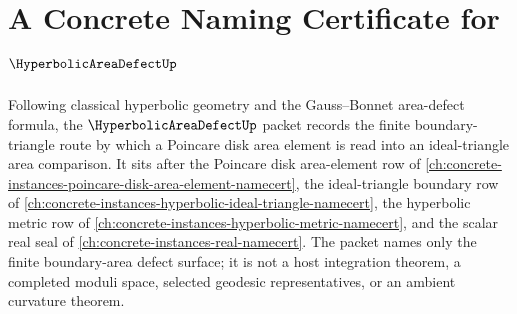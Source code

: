 \chapter{A Concrete Naming Certificate for $\HyperbolicAreaDefectUp$}
\label{ch:concrete-instances-hyperbolic-area-defect-namecert}

Following classical hyperbolic geometry and the Gauss--Bonnet area-defect formula, the $\HyperbolicAreaDefectUp$ packet records the finite boundary-triangle route by which a Poincare disk area element is read into an ideal-triangle area comparison. It sits after the Poincare disk area-element row of \autoref{ch:concrete-instances-poincare-disk-area-element-namecert}, the ideal-triangle boundary row of \autoref{ch:concrete-instances-hyperbolic-ideal-triangle-namecert}, the hyperbolic metric row of \autoref{ch:concrete-instances-hyperbolic-metric-namecert}, and the scalar real seal of \autoref{ch:concrete-instances-real-namecert}. The packet names only the finite boundary-area defect surface; it is not a host integration theorem, a completed moduli space, selected geodesic representatives, or an ambient curvature theorem.

